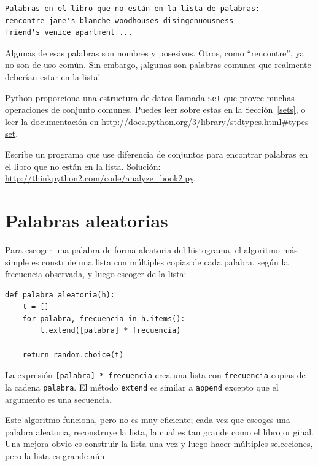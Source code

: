 \documentclass[10pt]{book}
\begin{document}
\begin{verbatim}
Palabras en el libro que no están en la lista de palabras:
rencontre jane's blanche woodhouses disingenuousness
friend's venice apartment ...
\end{verbatim}
%
Algunas de esas palabras son nombres y posesivos.  Otros, como
``rencontre'', ya no son de uso común.  Sin embargo, ¡algunas son
palabras comunes que realmente deberían estar en la lista!

\begin{exercise}

Python proporciona una estructura de datos llamada {\tt set} que provee muchas
operaciones de conjunto comunes.  Puedes leer sobre estas en la Sección~\ref{sets},
o leer la documentación en
\url{http://docs.python.org/3/library/stdtypes.html#types-set}.

Escribe un programa que use diferencia de conjuntos para encontrar palabras en el libro
que no están en la lista.  Solución:
\url{http://thinkpython2.com/code/analyze_book2.py}.

\end{exercise}


\section{Palabras aleatorias}
\label{randomwords}

Para escoger una palabra de forma aleatoria del histograma, el algoritmo más simple
es construie una lista con múltiples copias de cada palabra, según
la frecuencia observada, y luego escoger de la lista:

\begin{verbatim}
def palabra_aleatoria(h):
    t = []
    for palabra, frecuencia in h.items():
        t.extend([palabra] * frecuencia)

    return random.choice(t)
\end{verbatim}
%
La expresión {\tt [palabra] * frecuencia} crea una lista con {\tt frecuencia}
copias de la cadena {\tt palabra}.  El método {\tt extend}
es similar a {\tt append} excepto que el argumento es
una secuencia.

Este algoritmo funciona, pero no es muy eficiente; cada vez que
escoges una palabra aleatoria, reconstruye la lista, la cual es tan grande como
el libro original.  Una mejora obvio es construir la lista
una vez y luego hacer múltiples selecciones, pero la lista es grande aún.
\end{document}
